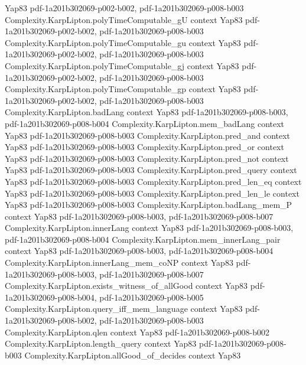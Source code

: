 \begin{theorem}
  {Yap83}
  {pdf-1a201b302069-p002-b002,
    pdf-1a201b302069-p008-b003}
\proofstep
  {Complexity.KarpLipton.polyTimeComputable_gU}
  {context}
  {Yap83}
  {pdf-1a201b302069-p002-b002,
    pdf-1a201b302069-p008-b003}
\proofstep
  {Complexity.KarpLipton.polyTimeComputable_gu}
  {context}
  {Yap83}
  {pdf-1a201b302069-p002-b002,
    pdf-1a201b302069-p008-b003}
\proofstep
  {Complexity.KarpLipton.polyTimeComputable_gj}
  {context}
  {Yap83}
  {pdf-1a201b302069-p002-b002,
    pdf-1a201b302069-p008-b003}
\proofstep
  {Complexity.KarpLipton.polyTimeComputable_gp}
  {context}
  {Yap83}
  {pdf-1a201b302069-p002-b002,
    pdf-1a201b302069-p008-b003}
\proofstep
  {Complexity.KarpLipton.badLang}
  {context}
  {Yap83}
  {pdf-1a201b302069-p008-b003,
    pdf-1a201b302069-p008-b004}
\proofstep
  {Complexity.KarpLipton.mem_badLang}
  {context}
  {Yap83}
  {pdf-1a201b302069-p008-b003}
\proofstep
  {Complexity.KarpLipton.pred_and}
  {context}
  {Yap83}
  {pdf-1a201b302069-p008-b003}
\proofstep
  {Complexity.KarpLipton.pred_or}
  {context}
  {Yap83}
  {pdf-1a201b302069-p008-b003}
\proofstep
  {Complexity.KarpLipton.pred_not}
  {context}
  {Yap83}
  {pdf-1a201b302069-p008-b003}
\proofstep
  {Complexity.KarpLipton.pred_query}
  {context}
  {Yap83}
  {pdf-1a201b302069-p008-b003}
\proofstep
  {Complexity.KarpLipton.pred_len_eq}
  {context}
  {Yap83}
  {pdf-1a201b302069-p008-b003}
\proofstep
  {Complexity.KarpLipton.pred_len_le}
  {context}
  {Yap83}
  {pdf-1a201b302069-p008-b003}
\proofstep
  {Complexity.KarpLipton.badLang_mem_P}
  {context}
  {Yap83}
  {pdf-1a201b302069-p008-b003,
    pdf-1a201b302069-p008-b007}
\proofstep
  {Complexity.KarpLipton.innerLang}
  {context}
  {Yap83}
  {pdf-1a201b302069-p008-b003,
    pdf-1a201b302069-p008-b004}
\proofstep
  {Complexity.KarpLipton.mem_innerLang_pair}
  {context}
  {Yap83}
  {pdf-1a201b302069-p008-b003,
    pdf-1a201b302069-p008-b004}
\proofstep
  {Complexity.KarpLipton.innerLang_mem_coNP}
  {context}
  {Yap83}
  {pdf-1a201b302069-p008-b003,
    pdf-1a201b302069-p008-b007}
\proofstep
  {Complexity.KarpLipton.exists_witness_of_allGood}
  {context}
  {Yap83}
  {pdf-1a201b302069-p008-b004,
    pdf-1a201b302069-p008-b005}
\proofstep
  {Complexity.KarpLipton.query_iff_mem_language}
  {context}
  {Yap83}
  {pdf-1a201b302069-p008-b002,
    pdf-1a201b302069-p008-b003}
\proofstep
  {Complexity.KarpLipton.qlen}
  {context}
  {Yap83}
  {pdf-1a201b302069-p008-b002}
\proofstep
  {Complexity.KarpLipton.length_query}
  {context}
  {Yap83}
  {pdf-1a201b302069-p008-b003}
\proofstep
  {Complexity.KarpLipton.allGood_of_decides}
  {context}
  {Yap83}

\end{theorem}
